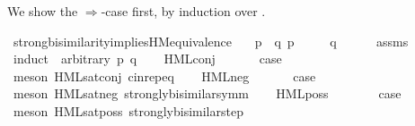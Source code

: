 \begin{isabellebody}
\begin{isamarkuptext}
We show the $\Longrightarrow$-case first, by induction over \isa{{\isasymphi}}.%
\end{isamarkuptext}\isamarkuptrue%
%
\isadelimvisible
%
\endisadelimvisible
%
\isatagvisible
{}\isamarkupfalse%
\ strong{\isacharunderscore}{\kern0pt}bisimilarity{\isacharunderscore}{\kern0pt}implies{\isacharunderscore}{\kern0pt}HM{\isacharunderscore}{\kern0pt}equivalence{\isacharcolon}{\kern0pt}\isanewline
\ \ \ {\isacartoucheopen}p\ {\isasymleftrightarrow}\ q{\isacartoucheclose}\ {\isacartoucheopen}p\ {\isasymTurnstile}\ {\isasymphi}{\isacartoucheclose}\isanewline
\ \ \ {\isacartoucheopen}q\ {\isasymTurnstile}\ {\isasymphi}{\isacartoucheclose}\isanewline
\ \ \isamarkupfalse%
\ assms\isanewline
{}\isamarkupfalse%
\ {\isacharparenleft}{\kern0pt}induct\ {\isasymphi}\ arbitrary{\isacharcolon}{\kern0pt}\ p\ q{\isacharparenright}{\kern0pt}\isanewline
\ \ \isamarkupfalse%
\ {\isacharparenleft}{\kern0pt}HML{\isacharunderscore}{\kern0pt}conj\ {\isasymPhi}{\isacharparenright}{\kern0pt}\isanewline
\ \ \isamarkupfalse%
\ \isamarkupfalse%
\ {\isacharquery}{\kern0pt}case\ \isanewline
\ \ \ \ \isamarkupfalse%
\ {\isacharparenleft}{\kern0pt}meson\ HML{\isacharunderscore}{\kern0pt}sat{\isacharunderscore}{\kern0pt}conj\ cin{\isachardot}{\kern0pt}rep{\isacharunderscore}{\kern0pt}eq{\isacharparenright}{\kern0pt}\isanewline
{}\isamarkupfalse%
\isanewline
\ \ \isamarkupfalse%
\ {\isacharparenleft}{\kern0pt}HML{\isacharunderscore}{\kern0pt}neg\ {\isasymphi}{\isacharparenright}{\kern0pt}\isanewline
\ \ \isamarkupfalse%
\ \isamarkupfalse%
\ {\isacharquery}{\kern0pt}case\isanewline
\ \ \ \ \isamarkupfalse%
\ {\isacharparenleft}{\kern0pt}meson\ HML{\isacharunderscore}{\kern0pt}sat{\isacharunderscore}{\kern0pt}neg\ strongly{\isacharunderscore}{\kern0pt}bisimilar{\isacharunderscore}{\kern0pt}symm{\isacharparenright}{\kern0pt}\isanewline
{}\isamarkupfalse%
\isanewline
\ \ \isamarkupfalse%
\ {\isacharparenleft}{\kern0pt}HML{\isacharunderscore}{\kern0pt}poss\ {\isasymalpha}\ {\isasymphi}{\isacharparenright}{\kern0pt}\isanewline
\ \ \isamarkupfalse%
\ \isamarkupfalse%
\ {\isacharquery}{\kern0pt}case\isanewline
\ \ \ \ \isamarkupfalse%
\ {\isacharparenleft}{\kern0pt}meson\ HML{\isacharunderscore}{\kern0pt}sat{\isacharunderscore}{\kern0pt}poss\ strongly{\isacharunderscore}{\kern0pt}bisimilar{\isacharunderscore}{\kern0pt}step{\isacharparenleft}{\kern0pt}{}{\isacharparenright}{\kern0pt}{\isacharparenright}{\kern0pt}\isanewline

\end{isabellebody}
